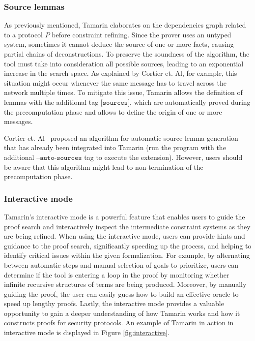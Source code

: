 \subsubsection{Source lemmas}
\label{sec:sourcelemmas}

As previously mentioned, Tamarin elaborates on the dependencies graph related to a protocol $P$ before constraint refining. Since the prover uses an untyped system, sometimes it cannot deduce the source of one or more facts, causing partial chains of deconstructions. To preserve the soundness of the algorithm, the tool must take into consideration all possible sources, leading to an exponential increase in the search space. As explained by Cortier et. Al\cite{autosources}, for example, this situation might occur whenever the same message has to travel across the network multiple times. To mitigate this issue, Tamarin allows the definition of lemmas with the additional tag $\texttt{[sources]}$, which are automatically proved during the precomputation phase and allows to define the origin of one or more messages.

Cortier et. Al~\cite{autosources} proposed an algorithm for automatic source lemma generation that has already been integrated into Tamarin (run the program with the additional $\texttt{--auto-sources}$ tag to execute the extension). However, users should be aware that this algorithm might lead to non-termination of the precomputation phase.

\subsubsection{Interactive mode}

Tamarin's interactive mode is a powerful feature that enables users to guide the proof search and interactively inspect the intermediate constraint systems as they are being refined. When using the interactive mode, users can provide hints and guidance to the proof search, significantly speeding up the process, and helping to identify critical issues within the given formalization. For example, by alternating between automatic steps and manual selection of goals to prioritize, users can determine if the tool is entering a loop in the proof by monitoring whether infinite recursive structures of terms are being produced. Moreover, by manually guiding the proof, the user can easily guess how to build an effective oracle to speed up lengthy proofs. Lastly, the interactive mode provides a valuable opportunity to gain a deeper understanding of how Tamarin works and how it constructs proofs for security protocols. An example of Tamarin in action in interactive mode is displayed in Figure \ref{fig:interactive}.

